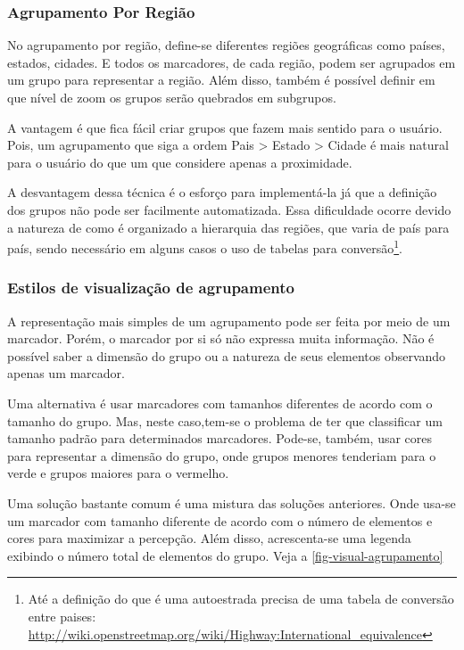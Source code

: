 		\subsubsection{Agrupamento Por Região}
			No agrupamento por região, define-se diferentes regiões geográficas como países, estados, cidades. E todos os marcadores, de cada região, podem ser agrupados em um grupo para representar a região. Além disso, também é possível definir em que nível de zoom os grupos serão quebrados em subgrupos. 
			
			A vantagem é que fica fácil criar grupos que fazem mais sentido para o usuário. Pois, um agrupamento que siga a ordem Pais > Estado > Cidade é mais natural para o usuário do que um que considere apenas a proximidade.
			
			A desvantagem dessa técnica é o esforço para implementá-la  \cite[182]{livroGoogleApiV3} já que a definição dos grupos não pode ser facilmente automatizada. Essa dificuldade ocorre devido a natureza de como é organizado a hierarquia das regiões, que varia de país para país, sendo necessário em alguns casos o uso de tabelas para conversão\footnote{Até a definição do que é uma autoestrada precisa de uma tabela de conversão entre paises: \url{http://wiki.openstreetmap.org/wiki/Highway:International_equivalence}}.
			
		\subsubsection{Estilos de visualização de agrupamento}
		A representação mais simples de um agrupamento pode ser feita por meio de um marcador. Porém, o marcador por si só não expressa muita informação. Não é possível saber a dimensão do grupo ou a natureza de seus elementos observando apenas um marcador.
		
		Uma alternativa é usar marcadores com tamanhos diferentes de acordo com o tamanho do grupo. Mas, neste caso,tem-se o problema de ter que classificar um tamanho padrão para determinados marcadores. Pode-se, também, usar cores para representar a dimensão do grupo, onde grupos menores tenderiam para o verde e grupos maiores para o vermelho.
		
		Uma solução bastante comum é uma mistura das soluções anteriores. Onde usa-se um marcador com tamanho diferente de acordo com o número de elementos e cores para maximizar a percepção. Além disso, acrescenta-se uma legenda exibindo o número total de elementos do grupo. Veja a \autoref{fig-visual-agrupamento}
		

